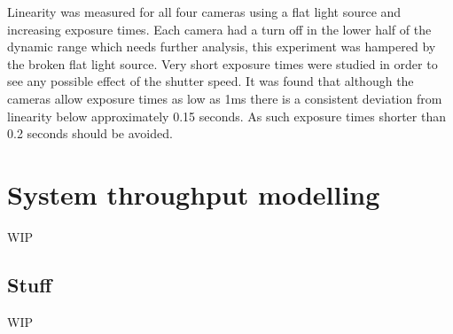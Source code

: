 \begin{colsection}
\begin{colsection}
Linearity was measured for all four cameras using a flat light source and increasing exposure times. Each camera had a turn off in the lower half of the dynamic range which needs further analysis, this experiment was hampered by the broken flat light source. Very short exposure times were studied in order to see any possible effect of the shutter speed. It was found that although the cameras allow exposure times as low as 1ms there is a consistent deviation from linearity below approximately 0.15 seconds. As such exposure times shorter than 0.2 seconds should be avoided.

\end{colsection}


\end{colsection}


\newpage
\section{System throughput modelling}
\label{sec:throughput}
\begin{colsection}


\begin{colsection}

WIP

\end{colsection}

\subsection{Stuff}
\label{sec:stuff}
\begin{colsection}

WIP

\end{colsection}


\end{colsection}


\newpage
